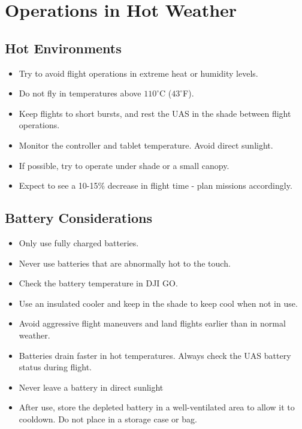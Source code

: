 \documentclass[
]{book}
\providecommand{\tightlist}{%
  \setlength{\itemsep}{0pt}\setlength{\parskip}{0pt}}
\begin{document}
\hypertarget{ch-hot_weather}{%
\chapter{Operations in Hot Weather}\label{ch-hot_weather}}

\hypertarget{hot-environments}{%
\section{Hot Environments}\label{hot-environments}}

\begin{itemize}
\tightlist
\item
  Try to avoid flight operations in extreme heat or humidity levels.
\item
  Do not fly in temperatures above \(110^\circ\)C (\(43^\circ\)F).
\item
  Keep flights to short bursts, and rest the UAS in the shade between flight operations.
\item
  Monitor the controller and tablet temperature. Avoid direct sunlight.
\item
  If possible, try to operate under shade or a small canopy.
\item
  Expect to see a 10-15\% decrease in flight time - plan missions accordingly.
\end{itemize}

\hypertarget{hot-battery}{%
\section{Battery Considerations}\label{hot-battery}}

\begin{itemize}
\tightlist
\item
  Only use fully charged batteries.
\item
  Never use batteries that are abnormally hot to the touch.
\item
  Check the battery temperature in DJI GO.
\item
  Use an insulated cooler and keep in the shade to keep cool when not in use.
\item
  Avoid aggressive flight maneuvers and land flights earlier than in normal weather.
\item
  Batteries drain faster in hot temperatures. Always check the UAS battery status during flight.
\item
  Never leave a battery in direct sunlight
\item
  After use, store the depleted battery in a well-ventilated area to allow it to cooldown. Do not place in a storage case or bag.
\end{itemize}
\end{document}
